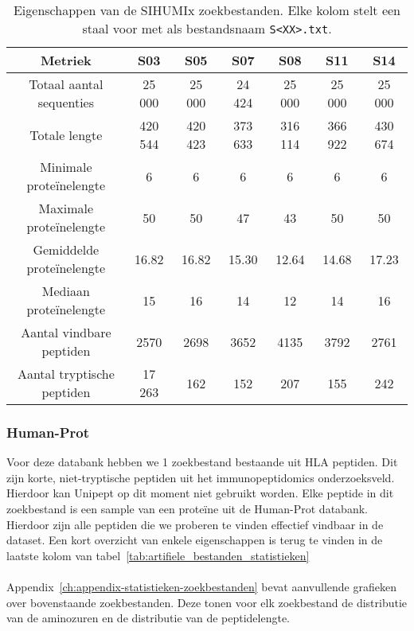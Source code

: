 \begin{table}[h!]
    \centering
    \begin{tabular}{ c c c c c c c }
        Metriek                    & S03     & S05     & S07     & S08     & S11     & S14     \\
        \hline\hline
        Totaal aantal sequenties   & 25 000  & 25 000  & 24 424  & 25 000  & 25 000  & 25 000  \\
        Totale lengte              & 420 544 & 420 423 & 373 633 & 316 114 & 366 922 & 430 674 \\
        Minimale proteïnelengte    & 6       & 6       & 6       & 6       & 6       & 6       \\
        Maximale proteïnelengte    & 50      & 50      & 47      & 43      & 50      & 50      \\
        Gemiddelde proteïnelengte  & 16.82   & 16.82   & 15.30   & 12.64   & 14.68   & 17.23   \\
        Mediaan proteïnelengte     & 15      & 16      & 14      & 12      & 14      & 16      \\
        Aantal vindbare peptiden   & 2570    & 2698    & 3652    & 4135    & 3792    & 2761    \\
        Aantal tryptische peptiden & 17 263  & 162     & 152     & 207     & 155     & 242     \\
        \hline
    \end{tabular}
    \caption{Eigenschappen van de SIHUMIx zoekbestanden. Elke kolom stelt een staal voor met als bestandsnaam \texttt{S<XX>.txt}.}
    \label{tab:sihumi_zoekbestanden}
\end{table}

\subsubsection{Human-Prot}
Voor deze databank hebben we 1 zoekbestand bestaande uit HLA peptiden.
Dit zijn korte, niet-tryptische peptiden uit het immunopeptidomics onderzoeksveld.
Hierdoor kan Unipept op dit moment niet gebruikt worden.
Elke peptide in dit zoekbestand is een sample van een proteïne uit de Human-Prot databank.
Hierdoor zijn alle peptiden die we proberen te vinden effectief vindbaar in de dataset.
Een kort overzicht van enkele eigenschappen is terug te vinden in de laatste kolom van tabel~\ref{tab:artifiele_bestanden_statistieken}
\\ \\
Appendix~\ref{ch:appendix-statistieken-zoekbestanden} bevat aanvullende grafieken over bovenstaande zoekbestanden.
Deze tonen voor elk zoekbestand de distributie van de aminozuren en de distributie van de peptidelengte.


